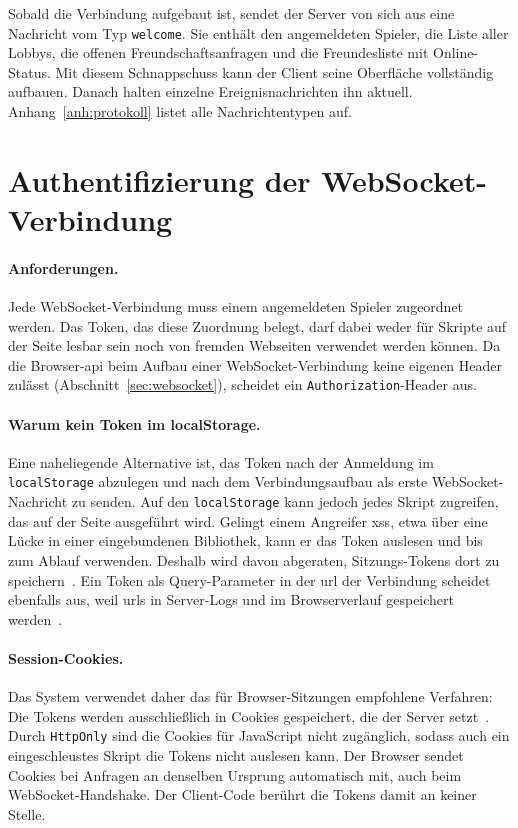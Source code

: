 Sobald die Verbindung aufgebaut ist, sendet der Server von sich aus eine Nachricht vom Typ \texttt{welcome}. Sie enthält den angemeldeten Spieler, die Liste aller Lobbys, die offenen Freundschaftsanfragen und die Freundesliste mit Online-Status. Mit diesem Schnappschuss kann der Client seine Oberfläche vollständig aufbauen. Danach halten einzelne Ereignisnachrichten ihn aktuell. Anhang~\ref{anh:protokoll} listet alle Nachrichtentypen auf.

\section{Authentifizierung der WebSocket-Verbindung}
\label{sec:wsauth}

\paragraph{Anforderungen.} Jede WebSocket-Verbindung muss einem angemeldeten Spieler zugeordnet werden. Das Token, das diese Zuordnung belegt, darf dabei weder für Skripte auf der Seite lesbar sein noch von fremden Webseiten verwendet werden können. Da die Browser-\gls{api} beim Aufbau einer WebSocket-Verbindung keine eigenen Header zulässt (Abschnitt~\ref{sec:websocket}), scheidet ein \texttt{Authorization}-Header aus.

\paragraph{Warum kein Token im localStorage.} Eine naheliegende Alternative ist, das Token nach der Anmeldung im \texttt{localStorage} abzulegen und nach dem Verbindungsaufbau als erste WebSocket-Nachricht zu senden. Auf den \texttt{localStorage} kann jedoch jedes Skript zugreifen, das auf der Seite ausgeführt wird. Gelingt einem Angreifer \gls{xss}, etwa über eine Lücke in einer eingebundenen Bibliothek, kann er das Token auslesen und bis zum Ablauf verwenden. Deshalb wird davon abgeraten, Sitzungs-Tokens dort zu speichern~\cite{OWASPHTML5}. Ein Token als Query-Parameter in der \gls{url} der Verbindung scheidet ebenfalls aus, weil \gls{url}s in Server-Logs und im Browserverlauf gespeichert werden~\cite{OWASPSession}.

\paragraph{Session-Cookies.} Das System verwendet daher das für Browser-Sitzungen empfohlene Verfahren: Die Tokens werden ausschließlich in Cookies gespeichert, die der Server setzt~\cite{OWASPSession,RFC6265}. Durch \texttt{HttpOnly} sind die Cookies für JavaScript nicht zugänglich, sodass auch ein eingeschleustes Skript die Tokens nicht auslesen kann. Der Browser sendet Cookies bei Anfragen an denselben Ursprung automatisch mit, auch beim WebSocket-Handshake. Der Client-Code berührt die Tokens damit an keiner Stelle.

